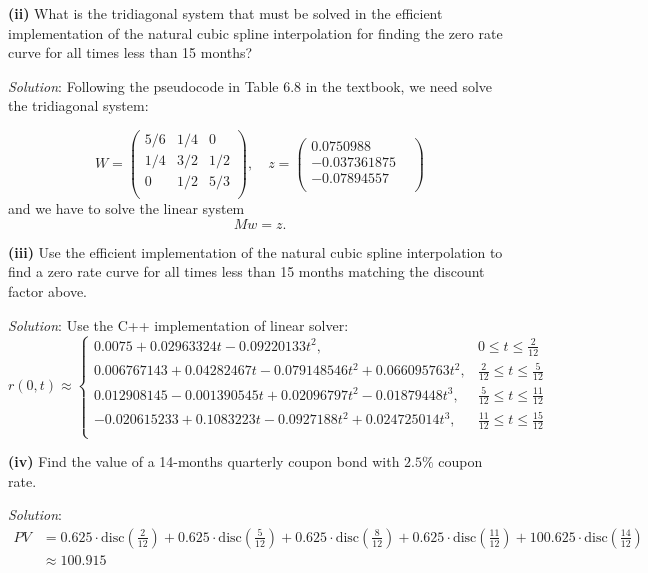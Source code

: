 \documentclass[paper=a4, fontsize=11pt]{scrartcl} %
\numberwithin{equation}{section} %
\numberwithin{figure}{section} %
\numberwithin{table}{section} %
\begin{document}
\textbf{(ii)} What is the tridiagonal system that must be solved in the efficient implementation
of the natural cubic spline interpolation for finding the zero rate curve for all times less 
than 15 months?

\textit{Solution}: Following the pseudocode in Table 6.8 in the textbook, we need solve the tridiagonal system:

$$
W = \begin{pmatrix}
5/6 & 1/4 & 0 \\
1/4 & 3/2 & 1/2 \\
0   & 1/2 & 5/3 \\
\end{pmatrix}, \quad
z = \begin{pmatrix}
0.0750988 & \\
-0.037361875 & \\
-0.07894557&\\
\end{pmatrix}
$$
and we have to solve the linear system
$$
Mw = z.
$$

\textbf{(iii)} Use the efficient implementation of the natural cubic spline interpolation
to find a zero rate curve for all times less than 15 months matching the discount factor above.

\textit{Solution}: Use the C++ implementation of linear solver:
\[ r(0,t) \approx \begin{cases} 
      0.0075+0.02963324t-0.09220133t^2, & 0\leq t \leq \frac{2}{12} \\
      0.006767143 + 0.04282467t - 0.079148546t^2 + 0.066095763t^2, & \frac{2}{12} \leq t \leq \frac{5}{12} \\
      0.012908145-0.001390545t+0.02096797t^2-0.01879448t^3, &  \frac{5}{12} \leq t \leq \frac{11}{12} \\
      -0.020615233+0.1083223t-0.0927188t^2+0.024725014t^3, & \frac{11}{12} \leq t \leq \frac{15}{12} \\
   \end{cases}
\]

\textbf{(iv)} Find the value of a 14-months quarterly coupon bond with $2.5\%$ coupon rate.

\textit{Solution}:
\begin{equation}
\begin{split}
\nonumber 
PV &= 0.625\cdot \text{disc}\left(\frac{2}{12}\right)+0.625\cdot \text{disc}\left(\frac{5}{12}\right)+0.625\cdot \text{disc}\left(\frac{8}{12}\right)+0.625\cdot \text{disc}\left(\frac{11}{12}\right) + 100.625\cdot \text{disc}\left(\frac{14}{12}\right)\\
    & \approx 100.915
\end{split}
\end{equation}
\end{document}
